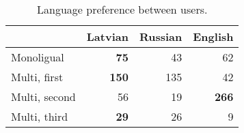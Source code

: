 \begin{table}[h]
  \centering
  \begin{tabular}{lrrr}
    \toprule
     & Latvian & Russian & English \\
    \midrule
    Monoligual     & \textbf{75} & 43 & 62  \\
    \addlinespace
    Multi, first   & \textbf{150} & 135 & 42  \\
    Multi, second  & 56 &  19 & \textbf{266}  \\
    Multi, third   & \textbf{29}  & 26 & 9  \\
    \bottomrule
  \end{tabular}
    \caption{Language preference between users.}
  \label{tab:language-use}
\end{table}